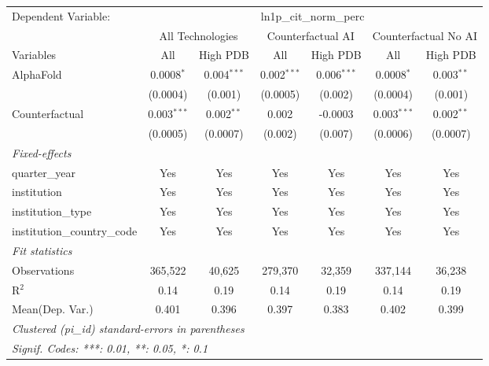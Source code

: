\begingroup
\centering
\begin{tabular}{lcccccc}
   \tabularnewline \midrule \midrule
   Dependent Variable: & \multicolumn{6}{c}{ln1p\_cit\_norm\_perc}\\
 & \multicolumn{2}{c}{All Technologies} & \multicolumn{2}{c}{Counterfactual AI} & \multicolumn{2}{c}{Counterfactual No AI} \\
\cmidrule(lr){1-1}\cmidrule(lr){2-3} \cmidrule(lr){4-5} \cmidrule(lr){6-7}
Variables & \multicolumn{1}{c}{All} & \multicolumn{1}{c}{High PDB} & \multicolumn{1}{c}{All} & \multicolumn{1}{c}{High PDB} & \multicolumn{1}{c}{All} & \multicolumn{1}{c}{High PDB} \\
\cmidrule(lr){1-1}\cmidrule(lr){2-2} \cmidrule(lr){3-3} \cmidrule(lr){4-4} \cmidrule(lr){5-5} \cmidrule(lr){6-6} \cmidrule(lr){7-7}
   AlphaFold                    & 0.0008$^{*}$  & 0.004$^{***}$ & 0.002$^{***}$ & 0.006$^{***}$ & 0.0008$^{*}$  & 0.003$^{**}$\\   
                                & (0.0004)      & (0.001)       & (0.0005)      & (0.002)       & (0.0004)      & (0.001)\\   
   Counterfactual               & 0.003$^{***}$ & 0.002$^{**}$  & 0.002         & -0.0003       & 0.003$^{***}$ & 0.002$^{**}$\\   
                                & (0.0005)      & (0.0007)      & (0.002)       & (0.007)       & (0.0006)      & (0.0007)\\   
   \midrule
   \emph{Fixed-effects}\\
   quarter\_year                & Yes           & Yes           & Yes           & Yes           & Yes           & Yes\\  
   institution                  & Yes           & Yes           & Yes           & Yes           & Yes           & Yes\\  
   institution\_type            & Yes           & Yes           & Yes           & Yes           & Yes           & Yes\\  
   institution\_country\_code   & Yes           & Yes           & Yes           & Yes           & Yes           & Yes\\  
   \midrule
   \emph{Fit statistics}\\
   Observations                 & 365,522       & 40,625        & 279,370       & 32,359        & 337,144       & 36,238\\  
   R$^2$                        & 0.14          & 0.19          & 0.14          & 0.19          & 0.14          & 0.19\\  
Mean(Dep. Var.) & 0.401 & 0.396 & 0.397 & 0.383 & 0.402 & 0.399 \\
   \midrule \midrule
   \multicolumn{7}{l}{\emph{Clustered (pi\_id) standard-errors in parentheses}}\\
   \multicolumn{7}{l}{\emph{Signif. Codes: ***: 0.01, **: 0.05, *: 0.1}}\\
\end{tabular}
\par\endgroup

